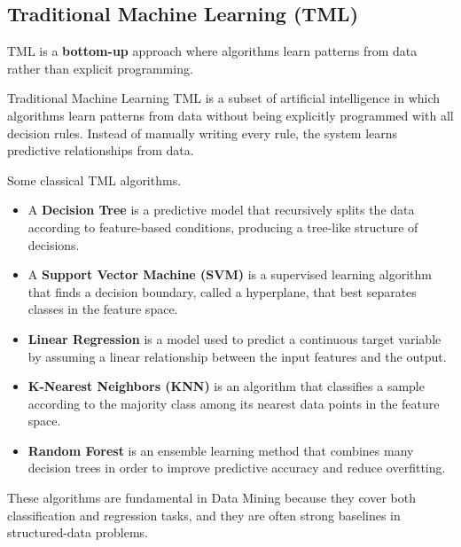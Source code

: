 \documentclass[11pt]{article}
\theoremstyle{smallexample}
\newcommand{\vs}{\vspace{0.2\baselineskip}}
\begin{document}
\subsection{Traditional Machine Learning (TML)}
TML is a \textbf{bottom-up} approach where algorithms learn patterns from data rather than explicit programming. 

 \begin{defbox}{Traditional Machine Learning}
 TML is a subset of artificial intelligence in which algorithms learn patterns from data without being explicitly programmed with all decision rules. Instead of manually writing every rule, the system learns predictive relationships from data.
 \end{defbox}

  Some classical TML algorithms.

\begin{itemize}
 \item A \textbf{Decision Tree} is a predictive model that recursively splits the data according to feature-based conditions, producing a tree-like structure of decisions.

 \vs


 \item A \textbf{Support Vector Machine (SVM)} is a supervised learning algorithm that finds a decision boundary, called a hyperplane, that best separates classes in the feature space.

 \vs


\item \textbf{ Linear Regression} is a model used to predict a continuous target variable by assuming a linear relationship between the input features and the output.
 
\vs


\item \textbf{ K-Nearest Neighbors (KNN)} is an algorithm that classifies a sample according to the majority class among its nearest data points in the feature space.
 
\vs


\item \textbf {Random Forest} is an ensemble learning method that combines many decision trees in order to improve predictive accuracy and reduce overfitting.
\end{itemize}

These algorithms are fundamental in Data Mining because they cover both classification and regression tasks, and they are often strong baselines in structured-data problems.
\end{document}
